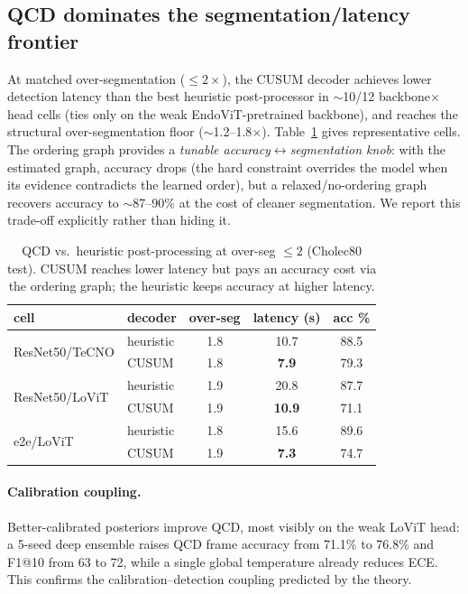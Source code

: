 \documentclass[11pt]{article}
\begin{document}
\subsection{QCD dominates the segmentation/latency frontier}
\label{sec:qcd-results}
At matched over-segmentation ($\le 2\times$), the CUSUM decoder achieves lower
detection latency than the best heuristic post-processor in $\sim$10/12
backbone$\times$head cells (ties only on the weak EndoViT-pretrained backbone), and
reaches the structural over-segmentation floor ($\sim$1.2--1.8$\times$).
Table~\ref{tab:qcd} gives representative cells. The ordering graph provides a
\emph{tunable accuracy$\leftrightarrow$segmentation knob}: with the estimated graph,
accuracy drops (the hard constraint overrides the model when its evidence
contradicts the learned order), but a relaxed/no-ordering graph recovers accuracy to
$\sim$87--90\% at the cost of cleaner segmentation. We report this trade-off
explicitly rather than hiding it.

\begin{table}[t]\centering\small
\caption{QCD vs.\ heuristic post-processing at over-seg $\le 2$ (Cholec80 test).
CUSUM reaches lower latency but pays an accuracy cost via the ordering graph; the
heuristic keeps accuracy at higher latency.}
\label{tab:qcd}
\begin{tabular}{llccc}
\toprule
cell & decoder & over-seg & latency (s) & acc \% \\
\midrule
\multirow{2}{*}{ResNet50/TeCNO} & heuristic & 1.8 & 10.7 & 88.5 \\
                                & CUSUM     & 1.8 & \textbf{7.9} & 79.3 \\
\multirow{2}{*}{ResNet50/LoViT} & heuristic & 1.9 & 20.8 & 87.7 \\
                                & CUSUM     & 1.9 & \textbf{10.9} & 71.1 \\
\multirow{2}{*}{e2e/LoViT}      & heuristic & 1.8 & 15.6 & 89.6 \\
                                & CUSUM     & 1.9 & \textbf{7.3} & 74.7 \\
\bottomrule
\end{tabular}
\end{table}

\paragraph{Calibration coupling.} Better-calibrated posteriors improve QCD, most
visibly on the weak LoViT head: a 5-seed deep ensemble raises QCD frame accuracy
from 71.1\% to 76.8\% and F1@10 from 63 to 72, while a single global temperature
already reduces ECE. This confirms the calibration--detection coupling predicted by
the theory.
\end{document}
